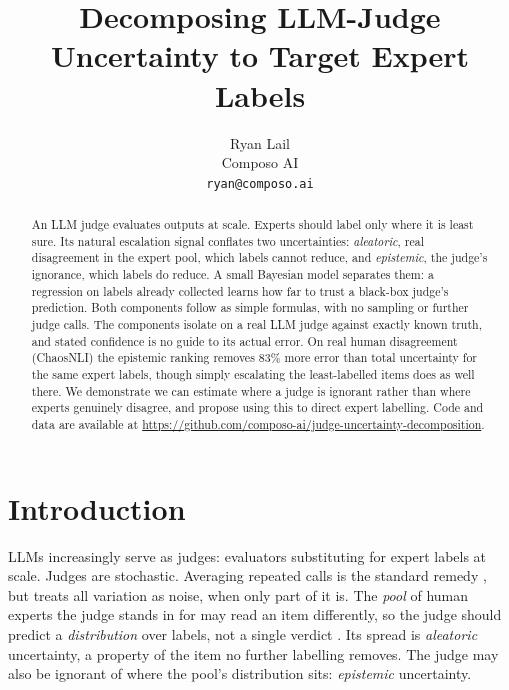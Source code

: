 \documentclass{article}
\title{Decomposing LLM-Judge Uncertainty to Target Expert Labels}
\author{%
  Ryan Lail \\
  Composo AI \\
  \texttt{ryan@composo.ai} \\
}
\begin{document}
\maketitle

\begin{abstract}
  An LLM judge evaluates outputs at scale. Experts should label only where it is
  least sure. Its natural escalation signal conflates two uncertainties:
  \emph{aleatoric}, real disagreement in the expert pool, which labels cannot
  reduce, and \emph{epistemic}, the judge's ignorance, which labels do reduce. A
  small Bayesian model separates them: a regression on labels already collected
  learns how far to trust a black-box judge's prediction. Both components follow as
  simple formulas, with no sampling or further judge calls. The components isolate on a
  real LLM judge against exactly known truth, and stated confidence is no guide to
  its actual error. On real human disagreement (ChaosNLI) the epistemic ranking removes
  83\% more error than total uncertainty for the same expert labels, though simply
  escalating the least-labelled items does as well there. We demonstrate we can estimate where a judge is ignorant rather than where
  experts genuinely disagree, and propose using this to direct expert labelling.
  Code and data are available at
  \url{https://github.com/composo-ai/judge-uncertainty-decomposition}.
\end{abstract}


\section{Introduction}
\label{sec:intro}

LLMs increasingly serve as judges: evaluators substituting for expert labels at
scale. Judges are stochastic. Averaging repeated calls is the
standard remedy \citep{lail2026}, but treats all variation as noise, when only
part of it is. The \emph{pool} of human experts the judge stands in for may read an
item differently, so the judge should predict a \emph{distribution} over labels, not
a single verdict \citep{baan2022,leonardelli2025}. Its spread is \emph{aleatoric}
uncertainty, a property of the item no further labelling removes. The judge may also
be ignorant of where the pool's distribution sits: \emph{epistemic} uncertainty.
\end{document}
